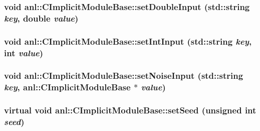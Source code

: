 \hypertarget{classanl_1_1CImplicitModuleBase_a972deba664b63faa952dd5ecd381d36e}{
\subsubsection[{setDoubleInput}]{\setlength{\rightskip}{0pt plus 5cm}void anl::CImplicitModuleBase::setDoubleInput (std::string {\em key}, \/  double {\em value})}}
\label{classanl_1_1CImplicitModuleBase_a972deba664b63faa952dd5ecd381d36e}
\hypertarget{classanl_1_1CImplicitModuleBase_afb474ef41f9f12afe1dd91317d8d9e9c}{
\subsubsection[{setIntInput}]{\setlength{\rightskip}{0pt plus 5cm}void anl::CImplicitModuleBase::setIntInput (std::string {\em key}, \/  int {\em value})}}
\label{classanl_1_1CImplicitModuleBase_afb474ef41f9f12afe1dd91317d8d9e9c}
\hypertarget{classanl_1_1CImplicitModuleBase_a861c1b40199365605ec76d155ac4ea4c}{
\subsubsection[{setNoiseInput}]{\setlength{\rightskip}{0pt plus 5cm}void anl::CImplicitModuleBase::setNoiseInput (std::string {\em key}, \/  {\bf anl::CImplicitModuleBase} $\ast$ {\em value})}}
\label{classanl_1_1CImplicitModuleBase_a861c1b40199365605ec76d155ac4ea4c}
\hypertarget{classanl_1_1CImplicitModuleBase_a12e7dc121de7ff95dd1952af2679867c}{
\subsubsection[{setSeed}]{\setlength{\rightskip}{0pt plus 5cm}virtual void anl::CImplicitModuleBase::setSeed (unsigned int {\em seed})}}
\label{classanl_1_1CImplicitModuleBase_a12e7dc121de7ff95dd1952af2679867c}


